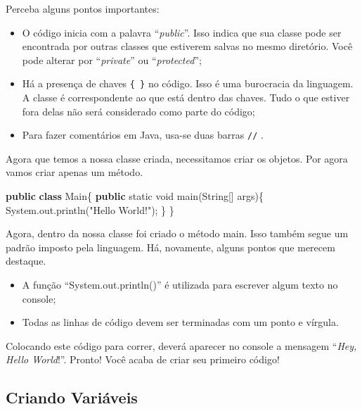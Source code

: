 \documentclass[
]{book}
\newenvironment{Shaded}{\begin{snugshade}}{\end{snugshade}}
\newcommand{\BuiltInTok}[1]{#1}
\newcommand{\DataTypeTok}[1]{\textcolor[rgb]{0.13,0.29,0.53}{#1}}
\newcommand{\FunctionTok}[1]{\textcolor[rgb]{0.00,0.00,0.00}{#1}}
\newcommand{\KeywordTok}[1]{\textcolor[rgb]{0.13,0.29,0.53}{\textbf{#1}}}
\newcommand{\NormalTok}[1]{#1}
\newcommand{\StringTok}[1]{\textcolor[rgb]{0.31,0.60,0.02}{#1}}
\providecommand{\tightlist}{%
  \setlength{\itemsep}{0pt}\setlength{\parskip}{0pt}}
\begin{document}
Perceba alguns pontos importantes:

\begin{itemize}
\tightlist
\item
  O código inicia com a palavra ``\emph{public}''. Isso indica que sua classe pode ser encontrada por outras classes que estiverem salvas no mesmo diretório. Você pode alterar por ``\emph{private}'' ou ``\emph{protected}'';
\item
  Há a presença de chaves \texttt{\{\ \}} no código. Isso é uma burocracia da linguagem. A classe é correspondente ao que está dentro das chaves. Tudo o que estiver fora delas não será considerado como parte do código;
\item
  Para fazer comentários em Java, usa-se duas barras \texttt{//} .
\end{itemize}

Agora que temos a nossa classe criada, necessitamos criar os objetos. Por agora vamos criar apenas um método.

\begin{Shaded}
\begin{Highlighting}[]
\KeywordTok{public} \KeywordTok{class}\NormalTok{ Main\{}
  \KeywordTok{public} \DataTypeTok{static} \DataTypeTok{void} \FunctionTok{main}\NormalTok{(}\BuiltInTok{String}\NormalTok{[] args)\{}
    \BuiltInTok{System}\NormalTok{.}\FunctionTok{out}\NormalTok{.}\FunctionTok{println}\NormalTok{(}\StringTok{"Hello World!"}\NormalTok{);}
\NormalTok{  \}}
\NormalTok{\}}
\end{Highlighting}
\end{Shaded}

Agora, dentro da nossa classe foi criado o método main. Isso também segue um padrão imposto pela linguagem. Há, novamente, alguns pontos que merecem destaque.

\begin{itemize}
\tightlist
\item
  A função ``System.out.println()'' é utilizada para escrever algum texto no console;
\item
  Todas as linhas de código devem ser terminadas com um ponto e vírgula.
\end{itemize}

Colocando este código para correr, deverá aparecer no console a mensagem ``\emph{Hey, Hello World}!''. Pronto! Você acaba de criar seu primeiro código!

\hypertarget{criando-variuxe1veis}{%
\subsection{Criando Variáveis}\label{criando-variuxe1veis}}
\end{document}
